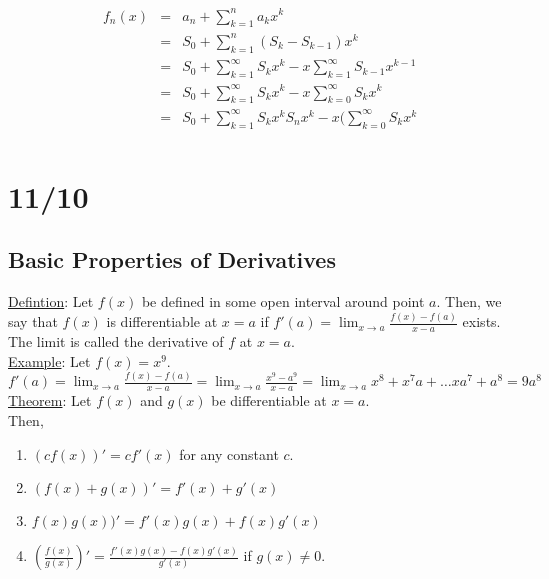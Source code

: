 \documentclass[11pt]{article}
\begin{document}
	\begin{eqnarray*}
	f_n(x) &=& a_n + \sum_{k = 1}^n a_k x^k\\
	&=& S_0 + \sum_{k = 1}^n (S_k - S_{k -1})x^k\\
	& =&  S_0 + \sum_{k = 1}^{\infty}S_k x^k - x\sum_{k = 1}^{\infty}S_{k-1} x^{k-1} \\
	& = & S_0 + \sum_{k = 1}^{\infty}S_k x^k - x\sum_{k = 0}^{\infty}S_{k} x^{k} \\
	& = & S_0 + \sum_{k = 1}^{\infty}S_k x^k S_n x^k - x(\sum_{k = 0}^{\infty}S_{k} x^{k} \\
	\end{eqnarray*}

\section*{11/10}
	\subsection*{Basic Properties of Derivatives}
		\underline{Defintion}: Let $f(x)$ be defined in some open interval
		around point $a$. Then, we say that $f(x)$ is differentiable at $x=a$
		if $f'(a) = \lim_{x \to a} \frac{f(x) - f(a)}{x - a}$ exists. The limit 
		is called the derivative of $f$ at $x = a$.\\
		\underline{Example}: Let $f(x) = x^9$.\\
		$f'(a) = \lim_{x \to a} \frac{f(x) - f(a)}{x - a} = \lim_{x \to a}
		\frac{x^9 - a^9}{x - a} = \lim_{x \to a} x^8 + x^7a + \ldots xa^7 + a^8
		= 9a^8$\\
		\underline{Theorem}: Let $f(x)$ and $g(x)$ be differentiable at $x = a$.\\
		Then, 
		\begin{enumerate}
			\item $(cf(x))' = cf'(x)$ for any constant $c$.
			\item $(f(x) + g(x))' = f'(x) + g'(x)$
			\item $f(x)g(x))' = f'(x)g(x) + f(x)g'(x)$
			\item $\left(\frac{f(x)}{g(x)}\right)' = \frac{f'(x)g(x) - f(x)g'(x)}
			{g'(x)}$ if $g(x) \not= 0$.
		\end{enumerate}
\end{document}
